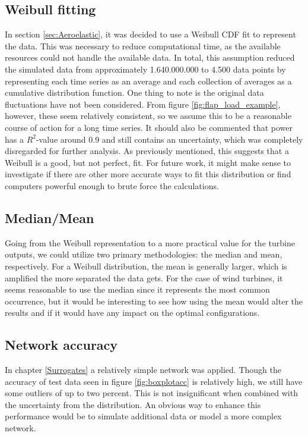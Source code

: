 \subsection{Weibull fitting}
In section \ref{sec:Aeroelastic}, it was decided to use a Weibull CDF fit to represent the data. This was necessary to reduce computational time, as the available resources could not handle the available data. In total, this assumption reduced the simulated data from approximately 1.640.000.000 to 4.500 data points by representing each time series as an average and each collection of averages as a cumulative distribution function. One thing to note is the original data fluctuations have not been considered. From figure \ref{fig:flap_load_example}, however, these seem relatively consistent, so we assume this to be a reasonable course of action for a long time series. It should also be commented that power has a $R^2$-value around 0.9 and still contains an uncertainty, which was completely disregarded for further analysis. As previously mentioned, this suggests that a Weibull is a good, but not perfect, fit. For future work, it might make sense to investigate if there are other more accurate ways to fit this distribution or find computers powerful enough to brute force the calculations. 

\subsection{Median/Mean}
Going from the Weibull representation to a more practical value for the turbine outputs, we could utilize two primary methodologies: the median and mean, respectively. For a Weibull distribution, the mean is generally larger, which is amplified the more separated the data gets. For the case of wind turbines, it seems reasonable to use the median since it represents the most common occurrence, but it would be interesting to see how using the mean would alter the results and if it would have any impact on the optimal configurations. 


\subsection{Network accuracy}

In chapter \ref{Surrogates} a relatively simple network was applied. Though the accuracy of test data seen in figure \ref{fig:boxplotacc} is relatively high, we still have some outliers of up to two percent. This is not insignificant when combined with the uncertainty from the distribution. An obvious way to enhance this performance would be to simulate additional data or model a more complex network. 


